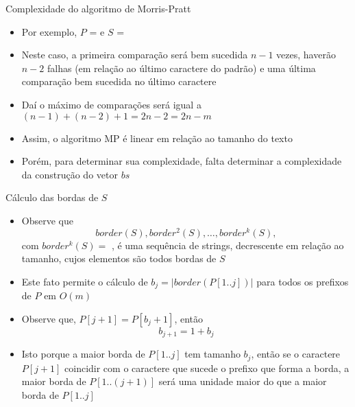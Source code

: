 \begin{frame}[fragile]{Complexidade do algoritmo de Morris-Pratt}

    \begin{itemize}
        \item Por exemplo, $P$ =  e $S$ = 

        \item Neste caso, a primeira comparação será bem sucedida $n - 1$ vezes, haverão $n - 2$
        falhas (em relação ao último caractere do padrão) e uma última comparação bem sucedida no 
        último caractere

        \item Daí o máximo de comparações será igual a $(n - 1) + (n - 2) + 1 = 2n - 2 = 2n - m$

        \item Assim, o algoritmo MP é linear em relação ao tamanho do texto

        \item Porém, para determinar sua complexidade, falta determinar a complexidade da 
            construção do vetor $bs$
    \end{itemize}

\end{frame}

\begin{frame}[fragile]{Cálculo das bordas de $S$}

    \begin{itemize}
        \item Observe que
        \[
            border(S), border^2(S), \ldots, border^k(S),
        \]
        com $border^k(S) = $ , é uma sequência de strings, decrescente em relação
        ao tamanho, cujos elementos são todos bordas de $S$

        \item Este fato permite o cálculo de $b_j = |border(P[1..j])|$ para todos os prefixos de 
            $P$ em $O(m)$

        \item Observe que, $P[j + 1] = P[b_j + 1]$, então 
        \[
            b_{j + 1} = 1 + b_j
        \]

        \item Isto porque a maior borda de $P[1..j]$ tem tamanho $b_j$, então se o caractere
            $P[j + 1]$ coincidir com o caractere que sucede o prefixo que forma a borda, 
            a maior borda de $P[1..(j+1)]$  será uma unidade maior do que a maior borda de $P[1..j]$
    \end{itemize}

\end{frame}

